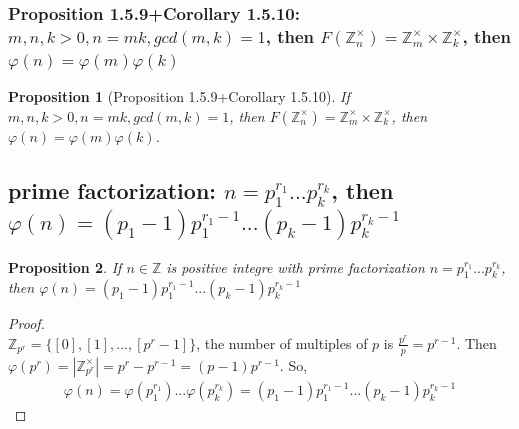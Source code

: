 \documentclass[11pt,a4paper]{article}
\newtheorem{proposition}{Proposition}
\begin{document}
\subsubsection{Proposition 1.5.9+Corollary 1.5.10: $m,n,k>0,n=mk,gcd(m,k)=1$, then $F(\mathbb{Z}_n^{\times})=\mathbb{Z}_m^{\times}\times\mathbb{Z}_k^{\times}$, then $\varphi(n)=\varphi(m)\varphi(k)$}
\begin{proposition}[Proposition 1.5.9+Corollary 1.5.10]
    If $m,n,k>0,n=mk,gcd(m,k)=1$, then $F(\mathbb{Z}_n^{\times})=\mathbb{Z}_m^{\times}\times\mathbb{Z}_k^{\times}$, then $\varphi(n)=\varphi(m)\varphi(k)$.
\end{proposition}

\subsection{prime factorization: $n=p_1^{r_1}...p_k^{r_k}$, then $\varphi(n)=(p_1-1)p_1^{r_1-1}...(p_k-1)p_k^{r_k-1}$}
\begin{proposition}
If $n\in\mathbb{Z}$ is positive integre with prime factorization $n=p_1^{r_1}...p_k^{r_k}$, then $\varphi(n)=(p_1-1)p_1^{r_1-1}...(p_k-1)p_k^{r_k-1}$
\end{proposition}
\begin{proof}
\quad\\
$\mathbb{Z}_{p^r}=\{[0],[1],...,[p^r-1]\}$, the number of multiples of $p$ is $\frac{p^r}{p}=p^{r-1}$. Then $\varphi(p^r)=|\mathbb{Z}_{p^r}^{\times}|=p^r-p^{r-1}=(p-1)p^{r-1}$. So,
\begin{equation}
    \begin{aligned}
        \varphi(n)=\varphi(p_1^{r_1})...\varphi(p_k^{r_k})=(p_1-1)p_1^{r_1-1}...(p_k-1)p_k^{r_k-1}
    \end{aligned}
    \nonumber
\end{equation}
\end{proof}
\end{document}
